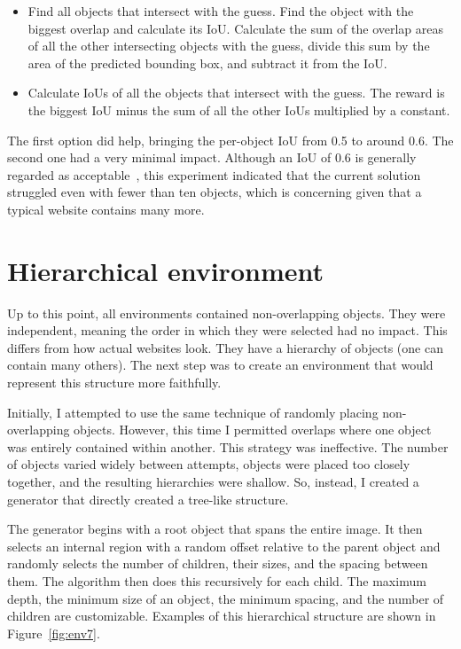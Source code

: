 \documentclass[
  digital,     %
  oneside,     %
  nosansbold,  %
  nocolorbold, %
  lof,         %
  lot,         %
]{fithesis4}
\begin{document}
\begin{itemize}
    \item Find all objects that intersect with the guess. Find the object with the biggest overlap and calculate its IoU. Calculate the sum of the overlap areas of all the other intersecting objects with the guess, divide this sum by the area of the predicted bounding box, and subtract it from the IoU.
    \item Calculate IoUs of all the objects that intersect with the guess. The reward is the biggest IoU minus the sum of all the other IoUs multiplied by a constant.
\end{itemize}

The first option did help, bringing the per-object IoU from 0.5 to around 0.6. The second one had a very minimal impact. Although an IoU of 0.6 is generally regarded as acceptable~\cite{DLforVisualSystems}, this experiment indicated that the current solution struggled even with fewer than ten objects, which is concerning given that a typical website contains many more.

\section{Hierarchical environment}
\label{sec:hierarchical-env}

Up to this point, all environments contained non-overlapping objects. They were independent, meaning the order in which they were selected had no impact. This differs from how actual websites look. They have a hierarchy of objects (one can contain many others). The next step was to create an environment that would represent this structure more faithfully.

Initially, I attempted to use the same technique of randomly placing non-overlapping objects. However, this time I permitted overlaps where one object was entirely contained within another. This strategy was ineffective. The number of objects varied widely between attempts, objects were placed too closely together, and the resulting hierarchies were shallow. So, instead, I created a generator that directly created a tree-like structure.

The generator begins with a root object that spans the entire image. It then selects an internal region with a random offset relative to the parent object and randomly selects the number of children, their sizes, and the spacing between them. The algorithm then does this recursively for each child. The maximum depth, the minimum size of an object, the minimum spacing, and the number of children are customizable. Examples of this hierarchical structure are shown in Figure~\ref{fig:env7}.
\end{document}
